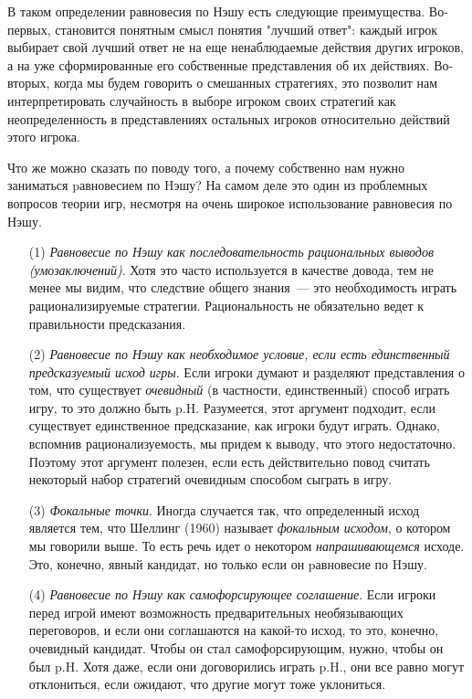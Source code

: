 \documentclass[12pt]{article}
\begin{document}
{В таком определении равновесия по Нэшу есть следующие преимущества.
Во-первых, становится понятным смысл понятия "лучший ответ": каждый
игрок выбирает свой лучший ответ не на еще ненаблюдаемые действия
других игроков, а на уже сформированные его собственные
представления об их действиях. Во-вторых, когда мы будем говорить о
смешанных стратегиях, это позволит нам интерпретировать случайность
в выборе игроком своих стратегий как неопределенность в
представлениях остальных игроков относительно действий этого игрока.


Что же можно сказать по поводу того, а почему собственно нам нужно
заниматься pавновесием по Hэшу? На самом деле это один из проблемных вопросов
теории игр, несмотря на очень широкое использование равновесия по Нэшу.
\begin{itemize}
\item[(1)] {\it Равновесие по Нэшу как последовательность рациональных
выводов (умозаключений)}. Хотя это часто используется в качестве
довода, тем не менее мы видим, что следствие общего знания~--- это
необходимость играть рационализируемые стратегии.  Рациональность не
обязательно ведет к правильности предсказания.

\item[(2)] {{\it Равновесие по Нэшу как необходимое условие, если есть
единственный предсказуемый исход игры}. Если игроки думают и
разделяют представления о том, что существует {\it очевидный} (в
частности, единственный) способ играть игру, то это должно быть p.H.
Разумеется, этот аргумент подходит, если существует  единственное
предсказание, как игроки будут играть. Однако, вспомнив
рационализуемость, мы придем к выводу, что этого недостаточно.
Поэтому этот аргумент полезен, если есть действительно повод считать
некоторый набор стратегий очевидным способом сыграть в игру.}

\item[(3)] {\it Фокальные точки}. Иногда случается так, что  определенный
исход является тем, что Шеллинг (1960) называет {\it фокальным
исходом}, о котором мы говорили выше. То есть речь идет о некотором
\emph{напрашивающемся} исходе. Это, конечно, явный кандидат, но
только если он pавновесие по Hэшу.

\item[(4)] {\it Равновесие по Нэшу как самофорсирующее соглашение}.
Если игроки перед игрой имеют возможность предварительных
необязывающих переговоров, и если они соглашаются на какой-то исход,
то это, конечно, очевидный кандидат. Чтобы он стал самофорсирующим,
нужно, чтобы он был p.H. Хотя даже, если они договорились играть
p.H., они все равно могут отклониться, если ожидают, что другие
могут тоже уклониться.


\end{itemize}}
\end{document}
